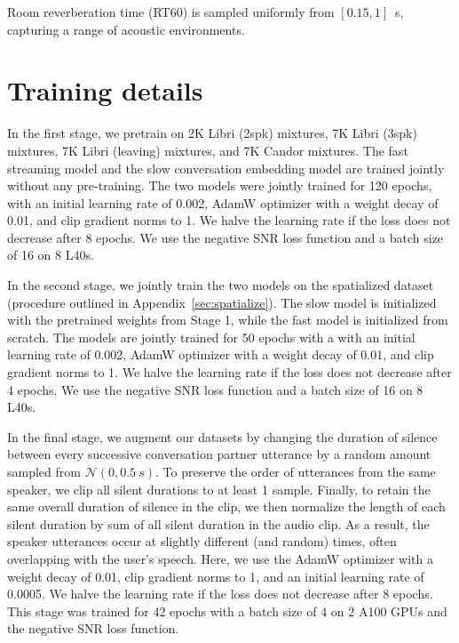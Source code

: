 Room reverberation time (RT60) is sampled uniformly from $[0.15, 1]$~s, capturing a range of acoustic environments.





\section{Training  details}\label{sec:trainingdetails}
In the first stage, we pretrain on 2K Libri (2spk) mixtures, 7K Libri (3spk) mixtures, 7K Libri (leaving) mixtures, and 7K Candor mixtures. The fast streaming model and the slow conversation embedding model are trained jointly without any pre-training. The two models were jointly trained for 120 epochs, with an initial learning rate of 0.002, AdamW optimizer with a weight decay of 0.01, and clip gradient norms to 1. We halve the learning rate if the loss does not decrease after 8 epochs. We use the negative SNR loss function and a batch size of 16 on 8 L40s.

{In the second stage, we jointly train the two models on the spatialized dataset (procedure outlined in Appendix~\ref{sec:spatialize}). The slow model is initialized with the pretrained weights from Stage 1, while the fast model is initialized from scratch. The models are jointly trained for 50 epochs with a with an initial learning rate of 0.002, AdamW optimizer with a weight decay of 0.01, and clip gradient norms to 1. We halve the learning rate if the loss does not decrease after 4 epochs. We use the negative SNR loss function and a batch size of 16 on 8 L40s.}

In the final stage, we augment our datasets by changing the duration of silence between every successive conversation partner utterance by a random amount sampled from $\mathcal{N}(0, 0.5~s)$. To preserve the order of utterances from the same speaker, we clip all silent durations to at least 1 sample. Finally, to retain the same overall duration of silence in the clip, we then normalize the length of each silent duration by sum of all silent duration in the audio clip. As a result, the speaker utterances occur at slightly different (and random) times, often overlapping with the user's speech. Here, we use the AdamW optimizer with a weight decay of 0.01, clip gradient norms to 1, and an initial learning rate of 0.0005. We halve the learning rate if the loss does not decrease after 8 epochs. This stage was trained for 42 epochs with a batch size of 4 on 2 A100 GPUs and the negative SNR loss function.




